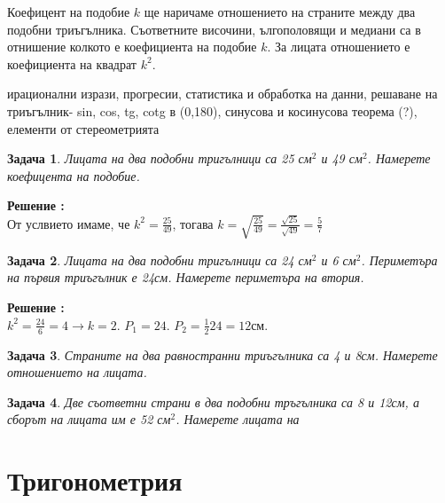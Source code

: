 \documentclass{article}
\newtheorem{problem}{Задача}
\newcounter{solution}
\newcommand\solution{%
	\stepcounter{solution}%
	\textbf{Решение :}\\%
}
\begin{document}
	Коефицент на подобие $k$ ще наричаме отношението на страните между два подобни триъгълника. Съответните височини, ългополовящи и медиани са в отнишение колкото е коефициента на подобие $k$. За лицата отношението е коефициента на квадрат $k^2$.
	
	\vspace{2cm}
	ирационални изрази, прогресии, статистика и обработка на данни, 
	решаване на триъгълник- sin, cos, tg, cotg в (0,180), синусова и косинусова теорема (?), елементи от стереометрията
	
	\begin{problem}
		Лицата на два подобни тригълници са 25 см$^2$ и 49 см$^2$. Намерете коефицента на подобие.
	\end{problem}
 \solution 
 От услвието имаме, че $k^2 = \frac{25}{49}$, тогава $ k = \sqrt{\frac{25}{49}} = \frac{\sqrt {25}}{ \sqrt {49}} = \frac{5}{7}  $	
	
	\begin{problem}
		Лицата на два подобни тригълници са 24 см$^2$ и 6 см$^2$. Периметъра на първия триъгълник е 24см. Намерете периметъра на втория.
	\end{problem}	

	\solution $ k^2 = \frac{24}{6} = 4 \to k = 2$. $P_1 = 24$. $ P_2 = \frac{1}{2}24 = 12$см. 


\begin{problem}
Страните на два равностранни триъгълника са 4 и 8см. Намерете отношението на лицата.
\end{problem}	

\begin{problem}
Две съответни страни в два подобни тръгълника са 8 и 12см, а сборът на лицата им е 52 см$^2$. Намерете лицата на 
\end{problem}	
 
 


\section{Тригонометрия}
\end{document}
